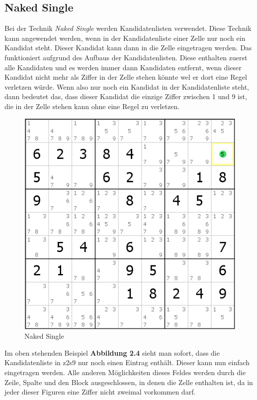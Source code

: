 \newpage
\subsection{Naked Single}
\label{Naked_Single}
Bei der Technik \textit{Naked Single} werden Kandidatenlisten verwendet. Diese Technik kann angewendet werden, wenn in der Kandidatenliste einer Zelle nur noch ein Kandidat steht. Dieser Kandidat kann dann in die Zelle eingetragen werden. Das funktioniert aufgrund des Aufbaus der Kandidatenlisten. Diese enthalten zuerst alle Kandidaten und es werden immer dann Kandidaten entfernt, wenn dieser Kandidat nicht mehr als Ziffer in der Zelle stehen könnte wel er dort eine Regel verletzen würde. Wenn also nur noch ein Kandidat in der Kandidatenliste steht, dann bedeutet das, dass dieser Kandidat die einzige Ziffer zwischen 1 und 9 ist, die in der Zelle stehen kann ohne eine Regel zu verletzen.

\begin{figure}[h]
\begin{center}
\includegraphics{./img/naked_single.png}
\caption{Naked Single}
\end{center}
\end{figure}

Im oben stehenden Beispiel \textbf{Abbildung 2.4} sieht man sofort, dass die Kandidatenliste in z2s9 nur noch einen Eintrag enthält. Dieser kann nun einfach eingetragen werden. Alle anderen Möglichkeiten dieses Feldes werden durch die Zeile, Spalte und den Block ausgeschlossen, in denen die Zelle enthalten ist, da in jeder dieser Figuren eine Ziffer nicht zweimal vorkommen darf.